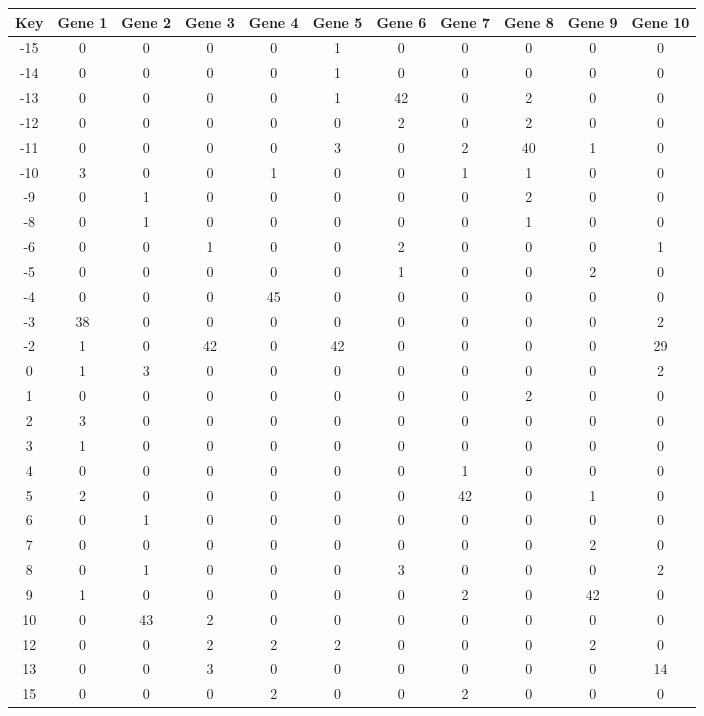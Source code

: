 \begin{tabular}{|c|c|c|c|c|c|c|c|c|c|c|}
\hline
Key & Gene 1 & Gene 2 & Gene 3 & Gene 4 & Gene 5 & Gene 6 & Gene 7 & Gene 8 & Gene 9 & Gene 10 \\
\hline
-15 & 0 & 0 & 0 & 0 & 1 & 0 & 0 & 0 & 0 & 0 \\
-14 & 0 & 0 & 0 & 0 & 1 & 0 & 0 & 0 & 0 & 0 \\
-13 & 0 & 0 & 0 & 0 & 1 & 42 & 0 & 2 & 0 & 0 \\
-12 & 0 & 0 & 0 & 0 & 0 & 2 & 0 & 2 & 0 & 0 \\
-11 & 0 & 0 & 0 & 0 & 3 & 0 & 2 & 40 & 1 & 0 \\
-10 & 3 & 0 & 0 & 1 & 0 & 0 & 1 & 1 & 0 & 0 \\
-9 & 0 & 1 & 0 & 0 & 0 & 0 & 0 & 2 & 0 & 0 \\
-8 & 0 & 1 & 0 & 0 & 0 & 0 & 0 & 1 & 0 & 0 \\
-6 & 0 & 0 & 1 & 0 & 0 & 2 & 0 & 0 & 0 & 1 \\
-5 & 0 & 0 & 0 & 0 & 0 & 1 & 0 & 0 & 2 & 0 \\
-4 & 0 & 0 & 0 & 45 & 0 & 0 & 0 & 0 & 0 & 0 \\
-3 & 38 & 0 & 0 & 0 & 0 & 0 & 0 & 0 & 0 & 2 \\
-2 & 1 & 0 & 42 & 0 & 42 & 0 & 0 & 0 & 0 & 29 \\
0 & 1 & 3 & 0 & 0 & 0 & 0 & 0 & 0 & 0 & 2 \\
1 & 0 & 0 & 0 & 0 & 0 & 0 & 0 & 2 & 0 & 0 \\
2 & 3 & 0 & 0 & 0 & 0 & 0 & 0 & 0 & 0 & 0 \\
3 & 1 & 0 & 0 & 0 & 0 & 0 & 0 & 0 & 0 & 0 \\
4 & 0 & 0 & 0 & 0 & 0 & 0 & 1 & 0 & 0 & 0 \\
5 & 2 & 0 & 0 & 0 & 0 & 0 & 42 & 0 & 1 & 0 \\
6 & 0 & 1 & 0 & 0 & 0 & 0 & 0 & 0 & 0 & 0 \\
7 & 0 & 0 & 0 & 0 & 0 & 0 & 0 & 0 & 2 & 0 \\
8 & 0 & 1 & 0 & 0 & 0 & 3 & 0 & 0 & 0 & 2 \\
9 & 1 & 0 & 0 & 0 & 0 & 0 & 2 & 0 & 42 & 0 \\
10 & 0 & 43 & 2 & 0 & 0 & 0 & 0 & 0 & 0 & 0 \\
12 & 0 & 0 & 2 & 2 & 2 & 0 & 0 & 0 & 2 & 0 \\
13 & 0 & 0 & 3 & 0 & 0 & 0 & 0 & 0 & 0 & 14 \\
15 & 0 & 0 & 0 & 2 & 0 & 0 & 2 & 0 & 0 & 0 \\
\hline
\end{tabular}